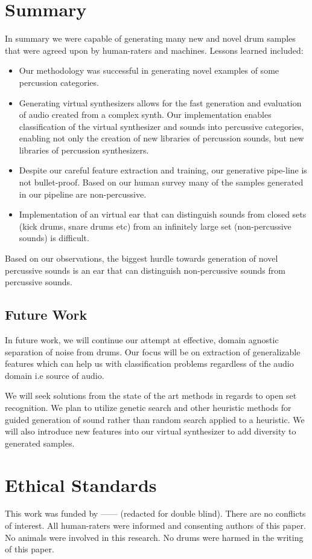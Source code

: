 \documentclass{nime-alternate} %
\begin{document}
\section{Summary}

\balance

In summary we were capable of generating many new and novel drum samples that were agreed upon by human-raters and machines. Lessons learned included:

\begin{itemize}
    \item Our methodology was successful in generating novel examples of some percussion categories.
    \item Generating virtual synthesizers allows for the fast generation and evaluation of audio created from a complex synth. Our implementation enables classification of the virtual synthesizer and sounds into percussive categories, enabling not only the creation of new libraries of percussion sounds, but new libraries of percussion synthesizers.
    \item Despite our careful feature extraction and training, our generative pipe-line is not bullet-proof. Based on our human survey many of the samples generated in our pipeline are non-percussive.
    \item Implementation of an virtual ear that can distinguish sounds from closed sets (kick drums, snare drums etc) from an infinitely large set (non-percussive sounds) is difficult. 
\end{itemize}

Based on our observations, the biggest hurdle towards generation of novel percussive sounds is an ear that can distinguish non-percussive sounds from percussive sounds. 

\subsection{Future Work}

In future work, we will continue our attempt at effective, domain agnostic separation of noise from drums.  Our focus will be on extraction of generalizable features which can help us with classification problems regardless of the audio domain i.e source of audio.
    
We will seek solutions from the state of the art methods in regards to open set recognition. We plan to utilize genetic search and other heuristic methods for guided generation of sound rather than random search applied to a heuristic. We will also introduce new features into our virtual synthesizer to add diversity to generated samples. 

\section{Ethical Standards}
This work was funded by ------ (redacted for double blind). There are no conflicts of interest. All human-raters were informed and consenting authors of this paper. No animals were involved in this research. No drums were harmed in the writing of this paper.

     
\end{document}
